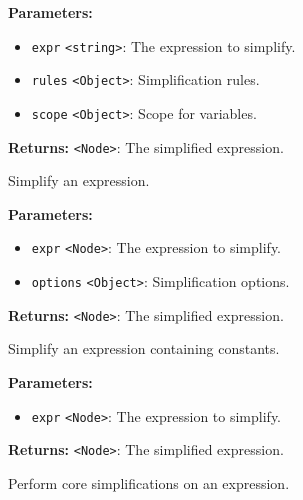 \documentclass[12pt,a4paper]{article}
\begin{document}
\vspace{5mm}
\noindent {}


\noindent \textbf{Parameters:}
\begin{itemize}
  \item \texttt{expr} \texttt{<string>}: The expression to simplify.
  \item \texttt{rules} \texttt{<Object>}: Simplification rules.
  \item \texttt{scope} \texttt{<Object>}: Scope for variables.
\end{itemize}

\noindent \textbf{Returns:} \texttt{<Node>}: The simplified expression.

\noindent Simplify an expression.

\vspace{5mm}
\noindent {}


\noindent \textbf{Parameters:}
\begin{itemize}
  \item \texttt{expr} \texttt{<Node>}: The expression to simplify.
  \item \texttt{options} \texttt{<Object>}: Simplification options.
\end{itemize}

\noindent \textbf{Returns:} \texttt{<Node>}: The simplified expression.

\noindent Simplify an expression containing constants.

\vspace{5mm}
\noindent {}


\noindent \textbf{Parameters:}
\begin{itemize}
  \item \texttt{expr} \texttt{<Node>}: The expression to simplify.
\end{itemize}

\noindent \textbf{Returns:} \texttt{<Node>}: The simplified expression.

\noindent Perform core simplifications on an expression.
\end{document}
